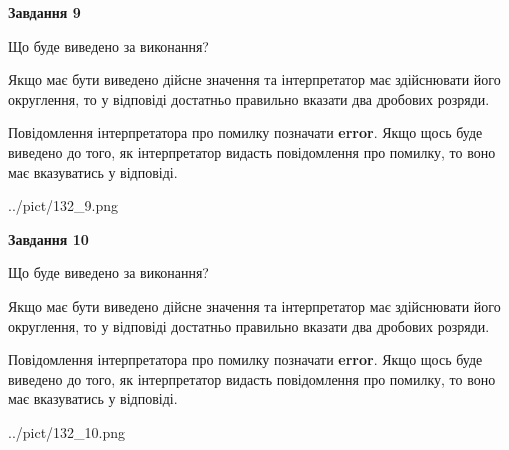 \documentclass[12pt, ukrainian]{article}
\begin{document}
{\begin {Large}
{\begin {center}\textbf{Завдання 9}\end {center}}\par
Що буде виведено за виконання? \par

Якщо має бути виведено дійсне значення та інтерпретатор має здійснювати його округлення, 
то у відповіді достатньо правильно вказати два дробових розряди.

Повідомлення інтерпретатора про помилку позначати \textbf{error}.
Якщо щось буде виведено до того, як інтерпретатор видасть повідомлення про помилку, 
то воно має вказуватись у відповіді. \par

\begin{center}
	{../pict/132_9.png}
\end{center}
\newpage

{\begin {center}\textbf{Завдання 10}\end {center}}\par
Що буде виведено за виконання? \par

Якщо має бути виведено дійсне значення та інтерпретатор має здійснювати його округлення, 
то у відповіді достатньо правильно вказати два дробових розряди.

Повідомлення інтерпретатора про помилку позначати \textbf{error}.
Якщо щось буде виведено до того, як інтерпретатор видасть повідомлення про помилку, 
то воно має вказуватись у відповіді. \par

\begin{center}
	{../pict/132_10.png}
\end{center}
\newpage

\end {Large}}
\end{document}
